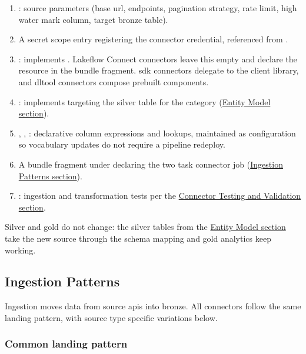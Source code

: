 \begin{enumerate}
    \item {}: source parameters (base \gls{url}, endpoints, pagination strategy, rate limit, high water mark column, target bronze table).
    \item A secret scope entry registering the connector credential, referenced from .
    \item {}: implements . Lakeflow Connect connectors leave this empty and declare the resource in the bundle fragment. \Gls{sdk} connectors delegate to the client library, and \gls{dltool} connectors compose prebuilt components.
    \item {}: implements  targeting the silver table for the category (\hyperref[sec:entity-model]{Entity Model section}).
    \item {}, , : declarative column expressions and lookups, maintained as configuration so vocabulary updates do not require a pipeline redeploy.
    \item A bundle fragment under  declaring the two task connector job (\hyperref[sec:ingestion-patterns]{Ingestion Patterns section}).
    \item {}: ingestion and transformation tests per the \hyperref[sec:connector-testing]{Connector Testing and Validation section}.
\end{enumerate}

Silver and gold do not change: the silver tables from the \hyperref[sec:entity-model]{Entity Model section} take the new source through the schema mapping and gold analytics keep working.


\subsection{Ingestion Patterns}
\label{sec:ingestion-patterns}

Ingestion moves data from source \glspl{api} into bronze. All connectors follow the same landing pattern, with source type specific variations below.

\subsubsection{Common landing pattern}

